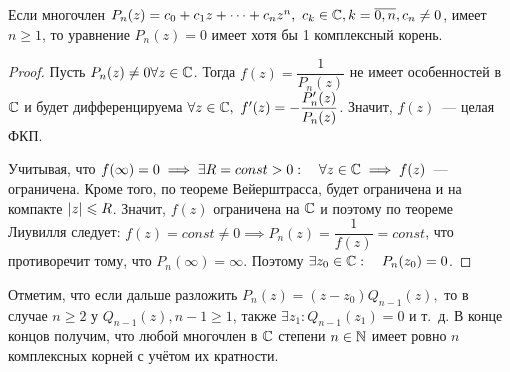 \documentclass[../../main.tex]{subfiles}
\begin{document}
\begin{crl}
	Если многочлен $ P_n(z) = c_0 + c_1z + \dots + c_nz^n,\ c_k \in \mathbb{C},
	k = \overline{0, n}, c_n \neq 0 $, имеет $ n \geq 1 $, то уравнение $ P_n(z) 
	= 0 $ имеет хотя бы 1 комплексный корень.
\end{crl}
\begin{proof}
	Пусть $ P_n(z) \neq 0 \forall z \in \mathbb{C} $.
	Тогда $ f(z) = \dfrac{1}{P_n(z)} $ не имеет особенностей в $ \mathbb{C} $ 
	и будет дифференцируема $ \forall z \in \mathbb{C},\
	f'(z) = -\dfrac{P_n'(z)}{P_n(z)} $. Значит, 
	$ f(z) $~--- целая ФКП.
	
	Учитывая, что $ f(\infty) = 0 \implies
	\exists R = const > 0:\quad \forall z \in \mathbb{C} \implies
	f(z) $~--- ограничена. Кроме того, по теореме Вейерштрасса, будет 
	ограничена и на компакте $ \left|{z}\right| \leqslant R $.
	Значит, $ f(z) $ ограничена на $ \mathbb{C} $ и поэтому по теореме Лиувилля следует:
	$ f(z) = const \neq 0 \implies P_n(z) = \dfrac{1}{f(z)} = const $, 
	что противоречит тому, что $ P_n(\infty)  = \infty $. Поэтому $ 
	\exists z_0 \in \mathbb{C}:\quad P_n(z_0) = 0 $.
\end{proof}

Отметим, что если дальше разложить $ P_n(z) = (z - z_0)Q_{n - 1}(z), $ 
то в случае $ n \geq 2 $ у $ Q_{n - 1}(z), n - 1 \geq 1 $, 
также $ \exists z_1 : Q_{n - 1}(z_1) = 0 $ и т.~д.
В конце концов получим, что любой многочлен в $ \mathbb{C} $ степени $ n \in \mathbb{N} $ 
имеет 
ровно $ n $ комплексных корней с учётом их кратности.
\end{document}
